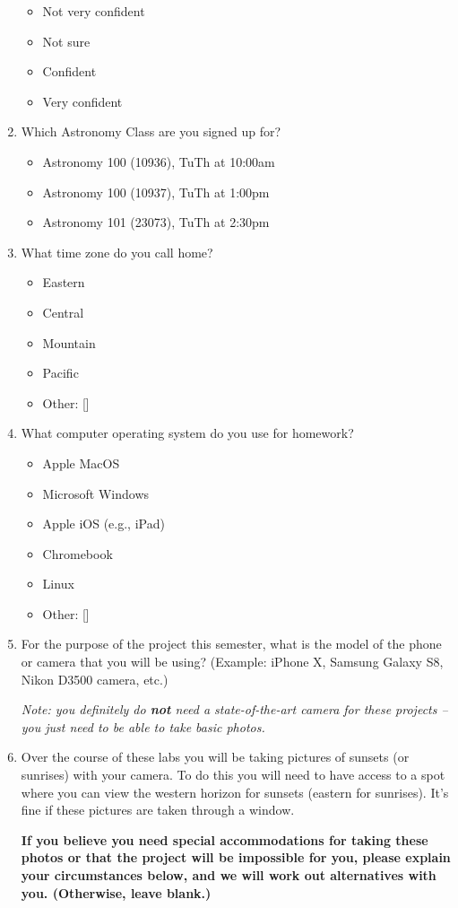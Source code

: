 \documentclass[12pt]{article}
\begin{document}
\begin{enumerate}
\begin{itemize}
    \item Not very confident
    \item Not sure
    \item Confident
    \item Very confident
\end{itemize}
\item
Which Astronomy Class are you signed up for?
\begin{itemize}
    \item Astronomy 100 (10936), TuTh at 10:00am
    \item Astronomy 100 (10937), TuTh at 1:00pm
    \item Astronomy 101 (23073), TuTh at 2:30pm
\end{itemize}
\item
What time zone do you call home?
\begin{itemize}
    \item Eastern
    \item Central
    \item Mountain
    \item Pacific
    \item Other: []
\end{itemize}
\item
What computer operating system do you use for homework?
\begin{itemize}
    \item Apple MacOS
    \item Microsoft Windows
    \item Apple iOS (e.g., iPad)
    \item Chromebook
    \item Linux
    \item Other: []
\end{itemize}
\item
For the purpose of the project this semester, what is the model of the phone or camera that you will be using? (Example: iPhone X, Samsung Galaxy S8, Nikon D3500 camera, etc.)

\textit{Note: you definitely do \textbf{not} need a state-of-the-art camera for these projects -- you just need to be able to take basic photos.}
\item
Over the course of these labs you will be taking pictures of sunsets (or sunrises) with your camera. To do this you will need to have access to a spot where you can view the western horizon for sunsets (eastern for sunrises). It's fine if these pictures are taken through a window.

\textbf{If you believe you need special accommodations for taking these photos or that the project will be impossible for you, please explain your circumstances below, and we will work out alternatives with you. (Otherwise, leave blank.)}
\end{enumerate}
\end{document}
